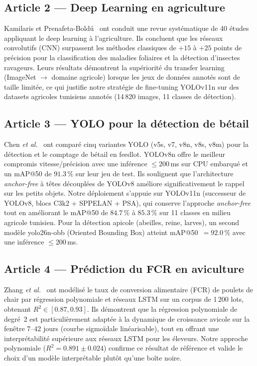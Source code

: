 \subsection*{Article 2 --- Deep Learning en agriculture}

Kamilaris et Prenafeta-Boldú~\cite{kamilaris2018} ont conduit une revue systématique
de 40 études appliquant le deep learning à l'agriculture.
Ils concluent que les réseaux convolutifs (CNN) surpassent les méthodes classiques
de $+15$ à $+25$ points de précision pour la classification des maladies foliaires
et la détection d'insectes ravageurs.
Leurs résultats démontrent la supériorité du transfer learning (ImageNet $\rightarrow$
domaine agricole) lorsque les jeux de données annotés sont de taille limitée,
ce qui justifie notre stratégie de fine-tuning YOLOv11n sur des datasets agricoles
tunisiens annotés (14\,820 images, 11 classes de détection).

\subsection*{Article 3 --- YOLO pour la détection de bétail}

Chen \textit{et al.}~\cite{chen2023yolo_livestock} ont comparé cinq variantes YOLO
(v5s, v7, v8n, v8s, v8m) pour la détection et le comptage de bétail en feedlot.
YOLOv8n offre le meilleur compromis vitesse/précision avec une inférence
$\leq 200$\,ms sur CPU embarqué et un mAP@50 de $91.3\,\%$ sur leur jeu de test.
Ils soulignent que l'architecture \textit{anchor-free} à têtes découplées de YOLOv8
améliore significativement le rappel sur les petits objets.
Notre déploiement s'appuie sur YOLOv11n (successeur de YOLOv8, blocs C3k2
+ SPPELAN + PSA), qui conserve l'approche \textit{anchor-free} tout en améliorant
le mAP@50 de $84.7\,\%$ à $85.3\,\%$ sur 11 classes en milieu agricole tunisien.
Pour la détection apicole (abeilles, reine, larves), un second modèle yolo26n-obb
(Oriented Bounding Box) atteint mAP@50~$= 92.0\,\%$ avec
une inférence $\leq 200$\,ms.

\subsection*{Article 4 --- Prédiction du FCR en aviculture}

Zhang \textit{et al.}~\cite{zhang2023fcr} ont modélisé le taux de conversion
alimentaire (FCR) de poulets de chair par régression polynomiale et réseaux LSTM
sur un corpus de 1\,200 lots, obtenant $R^2 \in [0.87, 0.93]$.
Ils démontrent que la régression polynomiale de degré~2 est particulièrement adaptée
à la dynamique de croissance avicole sur la fenêtre 7--42 jours (courbe sigmoïdale
linéarisable), tout en offrant une interprétabilité supérieure aux réseaux LSTM
pour les éleveurs.
Notre approche polynomiale ($R^2 = 0.891 \pm 0.024$) confirme ce résultat de
référence et valide le choix d'un modèle interprétable plutôt qu'une boîte noire.

